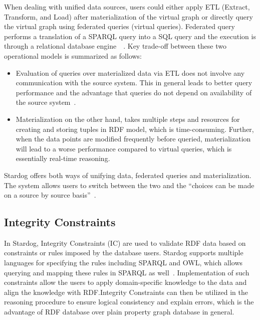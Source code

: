 When dealing with unified data sources, users could either apply ETL 
(Extract, Transform, and Load) after materialization of the virtual graph or 
directly query the virtual graph using federated queries (virtual queries). 
Federated query performs a translation of a SPARQL query into a SQL query 
and the execution is through a relational database 
engine~\cite{hid-sp18-405-blog-stardog-virtual2}~\cite{hid-sp18-405-diego2017ontop-stardog}.
 Key trade-off between these two operational models is summarized as 
 follows:
 \begin{itemize}
	\item Evaluation of queries over materialized data via ETL does not involve 
	any communication with the source system. This in general leads to better 
	query performance and the advantage that queries do not depend on 
	availability of the source system~\cite{hid-sp18-405-blog-stardog-virtual}.
	\item Materialization on the other hand, takes multiple steps and resources 
	for creating and storing tuples in RDF model, which is 
	time-consuming. Further, when the data points are modified frequently 
	before queried, materialization will lead to a worse performance compared 
	to virtual queries, which is essentially real-time reasoning.
\end{itemize}
Stardog offers both ways of unifying data, federated queries and 
materialization. The system allows users to switch between the two and the 
``choices can be made on a source by source 
basis''~\cite{hid-sp18-405-blog-stardog-virtual}.

\subsection{Integrity Constraints}
In Stardog, Integrity Constraints (IC) are used to validate RDF data based on 
constraints or rules imposed by the database users. Stardog supports 
multiple languages for specifying the rules including SPARQL and OWL, 
which allows querying and mapping these rules in SPARQL as 
well~\cite{hid-sp18-405-www-stardog-docs}. Implementation of such 
constraints allow the users to apply domain-specific knowledge to the data 
and align the knowledge with RDF.\@ Integrity Constraints can then be 
utilized in the reasoning procedure to ensure logical consistency and explain 
errors, which is the advantage of RDF database over plain property graph 
database in general. 

